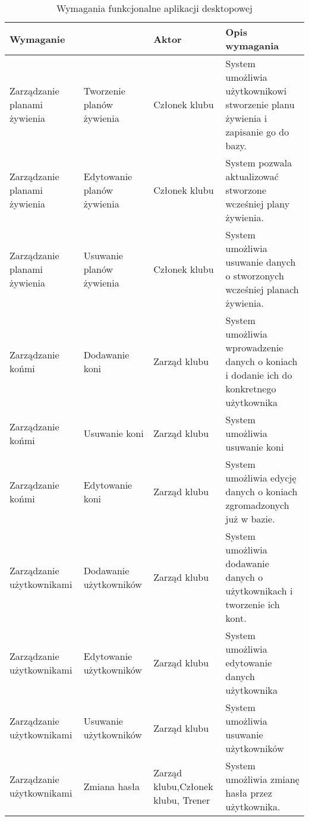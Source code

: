 \documentclass[12pt,twoside]{report}
\begin{document}
\begin{table}[h!]
	\centering
	\begin{tabular}{|p{3cm}|p{3cm}|p{4cm}|p{6cm}|}			
		\hline
		\multicolumn{2}{|l|}{Wymaganie} & Aktor & Opis wymagania\\
		\hline
		Zarządzanie planami żywienia & Tworzenie planów żywienia  & Członek klubu & System umożliwia użytkownikowi stworzenie planu żywienia i zapisanie go do bazy.\\		
		\hline
		Zarządzanie planami żywienia & Edytowanie planów żywienia  & Członek klubu & System pozwala aktualizować stworzone wcześniej plany żywienia.\\
		\hline
		Zarządzanie planami żywienia & Usuwanie planów żywienia  & Członek klubu & System umożliwia usuwanie danych o stworzonych wcześniej planach żywienia.\\
		\hline
		Zarządzanie końmi& Dodawanie koni & Zarząd klubu & System umożliwia wprowadzenie danych o koniach i dodanie ich do konkretnego użytkownika\\ 		
		\hline
		Zarządzanie końmi& Usuwanie koni & Zarząd klubu & System umożliwia usuwanie koni\\ 		
		\hline
		Zarządzanie końmi& Edytowanie koni & Zarząd klubu & System umożliwia edycję danych o koniach zgromadzonych już w bazie.\\ 
		\hline
		Zarządzanie użytkownikami & Dodawanie użytkowników & Zarząd klubu & System umożliwia dodawanie danych o użytkownikach i tworzenie ich kont.\\		
		\hline
		Zarządzanie użytkownikami & Edytowanie użytkowników & Zarząd klubu & System umożliwia edytowanie danych użytkownika\\		
		\hline
		Zarządzanie użytkownikami & Usuwanie użytkowników & Zarząd klubu & System umożliwia usuwanie użytkowników\\
		\hline
		Zarządzanie użytkownikami & Zmiana hasła & Zarząd klubu,Członek klubu, Trener& System umożliwia zmianę hasła przez użytkownika.\\
		\hline
		
	\end{tabular}
\caption{Wymagania funkcjonalne aplikacji desktopowej}
\label{funkcjonalneDesktop1}
\end{table}
\renewcommand{\arraystretch}{1.8}
\end{document}
